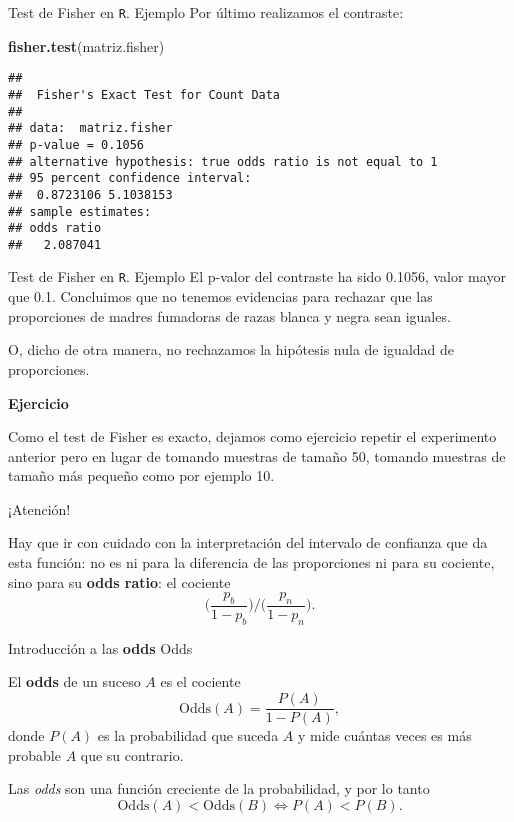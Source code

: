 \documentclass[
  ignorenonframetext,
]{beamer}
\newenvironment{Shaded}{\begin{snugshade}}{\end{snugshade}}
\newcommand{\KeywordTok}[1]{\textcolor[rgb]{0.13,0.29,0.53}{\textbf{#1}}}
\newcommand{\NormalTok}[1]{#1}
\begin{document}
\begin{frame}[fragile]{Test de Fisher en \texttt{R}. Ejemplo}
\protect\hypertarget{test-de-fisher-en-r.-ejemplo-3}{}
Por último realizamos el contraste:

\begin{Shaded}
\begin{Highlighting}[]
\KeywordTok{fisher.test}\NormalTok{(matriz.fisher)}
\end{Highlighting}
\end{Shaded}

\begin{verbatim}
## 
##  Fisher's Exact Test for Count Data
## 
## data:  matriz.fisher
## p-value = 0.1056
## alternative hypothesis: true odds ratio is not equal to 1
## 95 percent confidence interval:
##  0.8723106 5.1038153
## sample estimates:
## odds ratio 
##   2.087041
\end{verbatim}
\end{frame}

\begin{frame}{Test de Fisher en \texttt{R}. Ejemplo}
\protect\hypertarget{test-de-fisher-en-r.-ejemplo-4}{}
El p-valor del contraste ha sido 0.1056, valor mayor que 0.1. Concluimos
que no tenemos evidencias para rechazar que las proporciones de madres
fumadoras de razas blanca y negra sean iguales.

O, dicho de otra manera, no rechazamos la hipótesis nula de igualdad de
proporciones.

\textbf{Ejercicio}

Como el test de Fisher es exacto, dejamos como ejercicio repetir el
experimento anterior pero en lugar de tomando muestras de tamaño 50,
tomando muestras de tamaño más pequeño como por ejemplo 10.

¡Atención!

Hay que ir con cuidado con la interpretación del intervalo de confianza
que da esta función: no es ni para la diferencia de las proporciones ni
para su cociente, sino para su \textbf{odds ratio}: el cociente \[
\Big({\frac{p_b}{1-p_b}}\Big)\Big/\Big({\frac{p_n}{1-p_n}}\Big).
\]
\end{frame}

\begin{frame}{Introducción a las \textbf{odds}}
\protect\hypertarget{introducciuxf3n-a-las-odds}{}
Odds

El \textbf{odds} de un suceso \(A\) es el cociente \[
\mbox{Odds}(A)=\frac{P(A)}{1-P(A)},
\] donde \(P(A)\) es la probabilidad que suceda \(A\) y mide cuántas
veces es más probable \(A\) que su contrario.

Las \emph{odds} son una función creciente de la probabilidad, y por lo
tanto \[
\mbox{Odds}(A)<\mbox{Odds}(B)\Longleftrightarrow P(A)<P(B).
\]
\end{frame}
\end{document}
